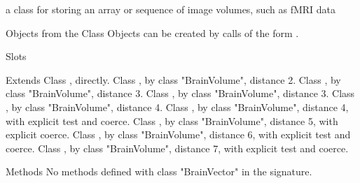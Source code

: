 \begin{Description}\relax
a class for storing an array or sequence of image volumes,
such as fMRI data
\end{Description}
\begin{Section}{Objects from the Class}
Objects can be created by calls of the form .
\end{Section}
\begin{Section}{Slots}
\end{Section}
\begin{Section}{Extends}
Class , directly.
Class , by class "BrainVolume", distance 2.
Class , by class "BrainVolume", distance 3.
Class , by class "BrainVolume", distance 3.
Class , by class "BrainVolume", distance 4.
Class , by class "BrainVolume", distance 4, with explicit test and coerce.
Class , by class "BrainVolume", distance 5, with explicit coerce.
Class , by class "BrainVolume", distance 6, with explicit test and coerce.
Class , by class "BrainVolume", distance 7, with explicit test and coerce.
\end{Section}
\begin{Section}{Methods}
No methods defined with class "BrainVector" in the signature.
\end{Section}


